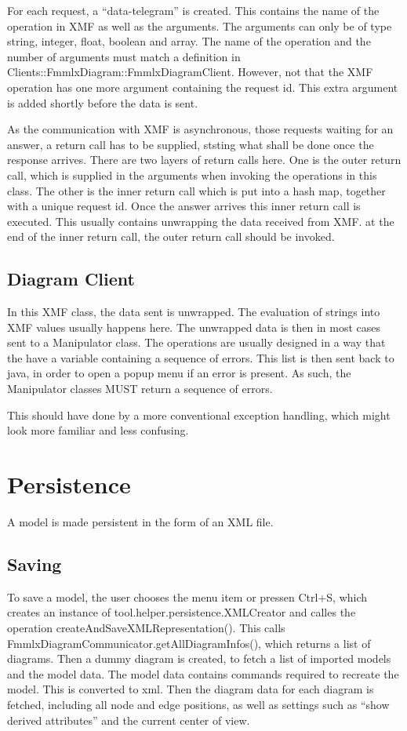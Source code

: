 \documentclass [11pt,letterpaper,twoside,openright]{book}
\begin{document}
For each request, a ``data-telegram'' is created. This contains the name of the operation in XMF as well as the arguments. The arguments can only be of type string, integer, float, boolean and array. The name of the operation and the number of arguments must match a definition in Clients::FmmlxDiagram::FmmlxDiagramClient. However, not that the XMF operation has one more argument containing the request id. This extra argument is added shortly before the data is sent.

As the communication with XMF is asynchronous, those requests waiting for an answer, a return call has to be supplied, ststing what shall be done once the response arrives. There are two layers of return calls here. One is the outer return call, which is supplied in the arguments when invoking the operations in this class. The other is the inner return call which is put into a hash map, together with a unique request id. Once the answer arrives this inner return call is executed. This usually contains unwrapping the data received from XMF. at the end of the inner return call, the outer return call should be invoked.

\section{Diagram Client}
In this XMF class, the data sent is unwrapped. The evaluation of strings into XMF values usually happens here. The unwrapped data is then in most cases sent to a Manipulator class. The operations are usually designed in a way that the have a variable containing a sequence of errors. This list is then sent back to java, in order to open a popup menu if an error is present. As such, the Manipulator classes MUST return a sequence of errors. 

This should have done by a more conventional exception handling, which might look more familiar and less confusing.


\chapter{Persistence}

A model is made persistent in the form of an XML file. 

\section{Saving}
To save a model, the user chooses the menu item or pressen Ctrl+S, which creates an instance of tool.helper.persistence.XMLCreator and calles the operation createAndSaveXMLRepresentation(). This calls FmmlxDiagramCommunicator.getAllDiagramInfos(), which returns a list of diagrams.
Then a dummy diagram is created, to fetch a list of imported models and the model data. The model data contains commands required to recreate the model. This is converted to xml. 
Then the diagram data for each diagram is fetched, including all node and edge positions, as well as settings such as ``show derived attributes'' and the current center of view.
\end{document}
